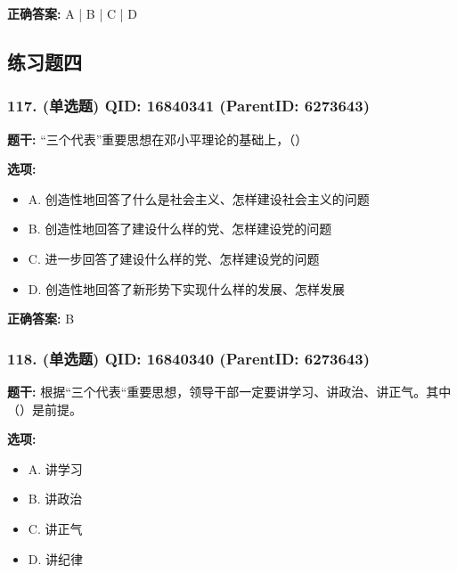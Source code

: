 \documentclass[12pt,UTF8]{ctexart}
\begin{document}
\textbf{正确答案:}
A | B | C | D

\vspace{0.3em}\hrulefill\vspace{0.7em}

\subsection*{练习题四}

\subsubsection*{117. (单选题) \small QID: 16840341 (ParentID: 6273643)}

\textbf{题干:}
“三个代表”重要思想在邓小平理论的基础上，（）



\textbf{选项:}
\begin{itemize}[leftmargin=*]

  \item A. 创造性地回答了什么是社会主义、怎样建设社会主义的问题

  \item B. 创造性地回答了建设什么样的党、怎样建设党的问题

  \item C. 进一步回答了建设什么样的党、怎样建设党的问题

  \item D. 创造性地回答了新形势下实现什么样的发展、怎样发展

\end{itemize}

\textbf{正确答案:}
B

\vspace{0.3em}\hrulefill\vspace{0.7em}

\subsubsection*{118. (单选题) \small QID: 16840340 (ParentID: 6273643)}

\textbf{题干:}
根据“三个代表“重要思想，领导干部一定要讲学习、讲政治、讲正气。其中（）是前提。



\textbf{选项:}
\begin{itemize}[leftmargin=*]

  \item A. 讲学习

  \item B. 讲政治

  \item C. 讲正气

  \item D. 讲纪律

\end{itemize}
\end{document}
